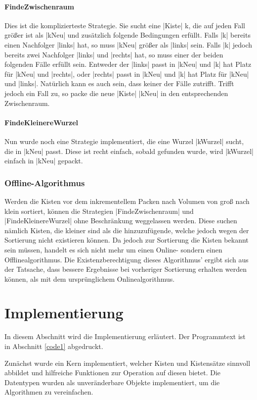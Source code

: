 \paragraph{FindeZwischenraum}
 Dies ist die komplizierteste Strategie. Sie sucht eine |Kiste| k, die auf jeden Fall größer ist als |kNeu| und zusätzlich folgende Bedingungen erfüllt.
 Falls |k| bereits einen Nachfolger |links| hat, so muss |kNeu| größer als |links| sein.
 Falls |k| jedoch bereits zwei Nachfolger |links| und |rechts| hat, so muss einer der beiden folgenden Fälle erfüllt sein.
  Entweder der |links|  passt in |kNeu| und |k| hat Platz für |kNeu| und |rechts|,
          oder |rechts| passt in |kNeu| und |k| hat Platz für |kNeu| und |links|.
 Natürlich kann es auch sein, dass keiner der Fälle zutrifft. Trifft jedoch ein Fall zu, so packe die neue |Kiste| |kNeu| in den entsprechenden Zwischenraum.
\paragraph{FindeKleinereWurzel}
 Nun wurde noch eine Strategie implementiert, die eine Wurzel |kWurzel| sucht, die in |kNeu| passt.
 Diese ist recht einfach, sobald gefunden wurde, wird |kWurzel| einfach in |kNeu| gepackt.
\subsubsection{Offline-Algorithmus}
 Werden die Kisten vor dem inkrementellem Packen nach Volumen von groß nach klein sortiert,
  können die Strategien |FindeZwischenraum| und |FindeKleinereWurzel| ohne Beschränkung weggelassen werden.
 Diese suchen nämlich Kisten, die kleiner sind als die hinzuzufügende, welche jedoch wegen der Sortierung nicht existieren können.
 Da jedoch zur Sortierung die Kisten bekannt sein müssen, handelt es sich nicht mehr um einen Online- sondern einen Offlinealgorithmus.
 Die Existenzberechtigung dieses Algorithmus' ergibt sich aus der Tatsache, dass bessere Ergebnisse bei vorheriger Sortierung erhalten werden können,
  als mit dem ursprünglichem Onlinealgorithmus.
\clearpage

\section{Implementierung}
\lstset{basicstyle=\ttfamily}
 In diesem Abschnitt wird die Implementierung erläutert. Der Programmtext ist in Abschnitt \ref{code1} abgedruckt.

 Zunächst wurde ein Kern implementiert, welcher Kisten und Kistensätze sinnvoll abbildet und hilfreiche Funktionen zur Operation auf diesen bietet.
 Die Datentypen wurden als unveränderbare Objekte implementiert, um die Algorithmen zu vereinfachen.

